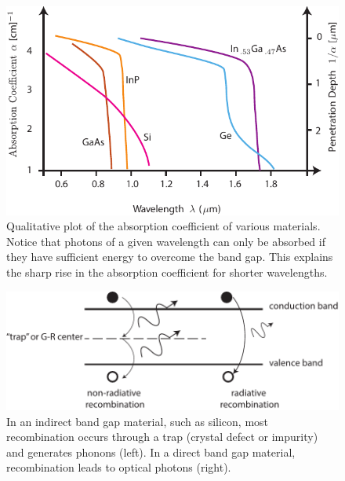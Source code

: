 \begin{figure}[H]
\centering
\includegraphics[width=.7\columnwidth]{semi_absorb_photon}
\caption{Qualitative plot of the absorption coefficient of various materials.  Notice that photons of a given wavelength can only be absorbed if they have sufficient energy to overcome the band gap.  This explains the sharp rise in the absorption coefficient for shorter wavelengths.} \label{fig:semi_absorb_photon}
\end{figure}
\begin{figure}[H]
\centering
\includegraphics[width=.6\columnwidth]{rad_vs_nonrad_reco}
\caption{In an indirect band gap material, such as silicon, most recombination occurs through a trap (crystal defect or impurity) and generates phonons (left).  In a direct band gap material, recombination leads to optical photons (right).}
\label{fig:rad_vs_nonrad_reco}
\end{figure}
\newpage
